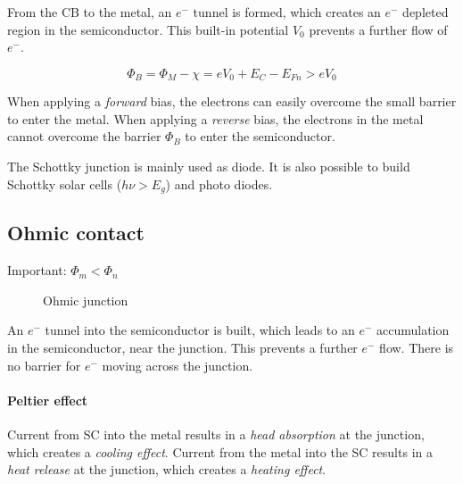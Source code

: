 From the CB to the metal, an $e^-$ tunnel is formed, which creates an $e^-$
depleted region in the semiconductor.
This built-in potential $V_0$ prevents a further flow of $e^-$.

\begin{equation}
    \Phi_B = \Phi_M - \chi = e V_0 + E_C - E_{Fn} > e V_0
\end{equation}

When applying a \emph{forward} bias, the electrons can easily overcome the small
barrier to enter the metal.
When applying a \emph{reverse} bias, the electrons in the metal cannot overcome
the barrier $\Phi_B$ to enter the semiconductor.

The Schottky junction is mainly used as diode. 
It is also possible to build Schottky solar cells ($h\nu>E_g$) and photo diodes.

\subsection{Ohmic contact}

Important: $\Phi_m < \Phi_n$

\begin{figure}[ht!]
    \centering
    
    \caption{Ohmic junction}
\end{figure}

An $e^-$ tunnel into the semiconductor is built, which leads to an $e^-$
accumulation in the semiconductor, near the junction. 
This prevents a further $e^-$ flow. 
There is no barrier for $e^-$ moving across the junction.

\paragraph{Peltier effect}
Current from SC into the metal results in a \emph{head absorption} at the junction,
which creates a \emph{cooling effect}.
Current from the metal into the SC results in a \emph{heat release} at the junction,
which creates a \emph{heating effect}.
